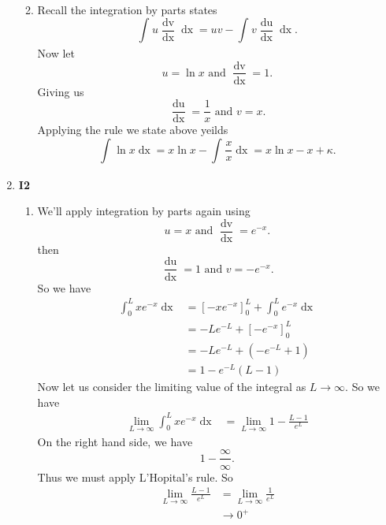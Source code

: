 \documentclass[12pt,oneside]{book}
\begin{document}
\begin{enumerate}
\begin{enumerate}
\begin{align*}
            \end{align*}
            \item Recall the integration by parts states \[
                \int_{}^{} u \frac{\mathop{\mathrm{d}v}}{\mathop{\mathrm{d}x}} \mathop{\mathrm{d}x} = uv - \int_{}^{} v \frac{\mathop{\mathrm{d}u}}{\mathop{\mathrm{d}x}} \mathop{\mathrm{d}x}  
            .\] Now let \[
                u = \ln x \text{ and } \frac{\mathop{\mathrm{d}v}}{\mathop{\mathrm{d}x}} = 1
            .\] Giving us \[
                \frac{\mathop{\mathrm{d}u}}{\mathop{\mathrm{d}x}} = \frac{1}{x} \text{ and } v = x
            .\] Applying the rule we state above yeilds \[
                \int_{}^{} \ln x \mathop{\mathrm{d}x} = x \ln x - \int_{}^{} \frac{x}{x} \mathop{\mathrm{d}x} = x \ln x - x + \kappa  
            .\] 
        \end{enumerate}
        \item \textbf{I2} \begin{enumerate}
            \item We'll apply integration by parts again using \[
                u = x \text{ and } \frac{\mathop{\mathrm{d}v}}{\mathop{\mathrm{d}x}} = e^{-x}
            .\] then \[
                \frac{\mathop{\mathrm{d}u}}{\mathop{\mathrm{d}x}} = 1 \text{ and } v = - e^{-x}
            .\] So we have \begin{align*}
                \int_{0}^{L} xe^{-x} \mathop{\mathrm{d}x} &= \left[ -xe^{-x} \right]_0^L + \int_{0}^{L} e^{-x} \mathop{\mathrm{d}x} \\
                &= -L e^{-L} + \left[  - e^{-x} \right]_0^L \\
                &= -L e^{-L} + \left( -e^{-L} + 1 \right) \\
                &= 1 - e^{-L} (L - 1)
            \end{align*}
            Now let us consider the limiting value of the integral as $L \to \infty$. So we have \begin{align*}
                \lim_{L \to \infty} \int_{0}^{L} xe^{-x} \mathop{\mathrm{d}x} &= \lim_{L \to \infty} 1 - \frac{L - 1}{e^L} 
            \end{align*}
            On the right hand side, we have \[
                1 - \frac{\infty}{\infty}
            .\] Thus we must apply L'Hopital's rule. So \begin{align*}
                \lim_{L \to \infty} \frac{L - 1}{e^L} &= \lim_{L \to \infty} \frac{1}{e^L} \\
                &\to 0^+
            \end{align*}

\end{enumerate}
\end{enumerate}
\end{document}
